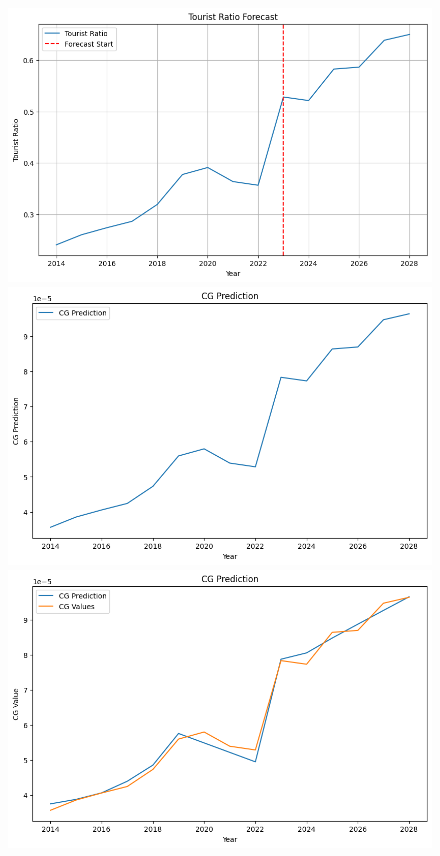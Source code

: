 \begin{figure}[H]
    \centering
    \begin{minipage}{0.32\textwidth}
        \centering
        \includegraphics[width=\textwidth]{Ratio.png}
    \end{minipage}
    \begin{minipage}{0.32\textwidth}
        \centering
        \includegraphics[width=\textwidth]{CG_pred.png}
    \end{minipage}
    \begin{minipage}{0.32\textwidth}
        \centering
        \includegraphics[width=\textwidth]{CG_pred2.png}
    \end{minipage}
\end{figure}

